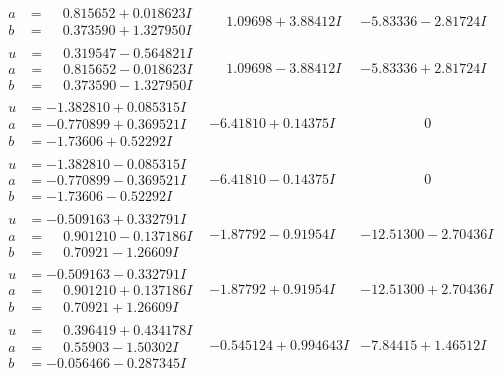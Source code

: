 \documentclass[1p]{elsarticle_modified}
\theoremstyle{definition}
\begin{document}
$$\begin{array}{c|c|c}
\begin{aligned}
a &= \phantom{-}0.815652 + 0.018623 I \\
b &= \phantom{-}0.373590 + 1.327950 I\end{aligned}
 & \phantom{-}1.09698 + 3.88412 I & -5.83336 - 2.81724 I \\ \hline\begin{aligned}
u &= \phantom{-}0.319547 - 0.564821 I \\
a &= \phantom{-}0.815652 - 0.018623 I \\
b &= \phantom{-}0.373590 - 1.327950 I\end{aligned}
 & \phantom{-}1.09698 - 3.88412 I & -5.83336 + 2.81724 I \\ \hline\begin{aligned}
u &= -1.382810 + 0.085315 I \\
a &= -0.770899 + 0.369521 I \\
b &= -1.73606 + 0.52292 I\end{aligned}
 & -6.41810 + 0.14375 I & \phantom{-0.000000 } 0 \\ \hline\begin{aligned}
u &= -1.382810 - 0.085315 I \\
a &= -0.770899 - 0.369521 I \\
b &= -1.73606 - 0.52292 I\end{aligned}
 & -6.41810 - 0.14375 I & \phantom{-0.000000 } 0 \\ \hline\begin{aligned}
u &= -0.509163 + 0.332791 I \\
a &= \phantom{-}0.901210 - 0.137186 I \\
b &= \phantom{-}0.70921 - 1.26609 I\end{aligned}
 & -1.87792 - 0.91954 I & -12.51300 - 2.70436 I \\ \hline\begin{aligned}
u &= -0.509163 - 0.332791 I \\
a &= \phantom{-}0.901210 + 0.137186 I \\
b &= \phantom{-}0.70921 + 1.26609 I\end{aligned}
 & -1.87792 + 0.91954 I & -12.51300 + 2.70436 I \\ \hline\begin{aligned}
u &= \phantom{-}0.396419 + 0.434178 I \\
a &= \phantom{-}0.55903 - 1.50302 I \\
b &= -0.056466 - 0.287345 I\end{aligned}
 & -0.545124 + 0.994643 I & -7.84415 + 1.46512 I \\ \hline\begin{aligned}

\end{aligned}
\end{array}$$
\end{document}
